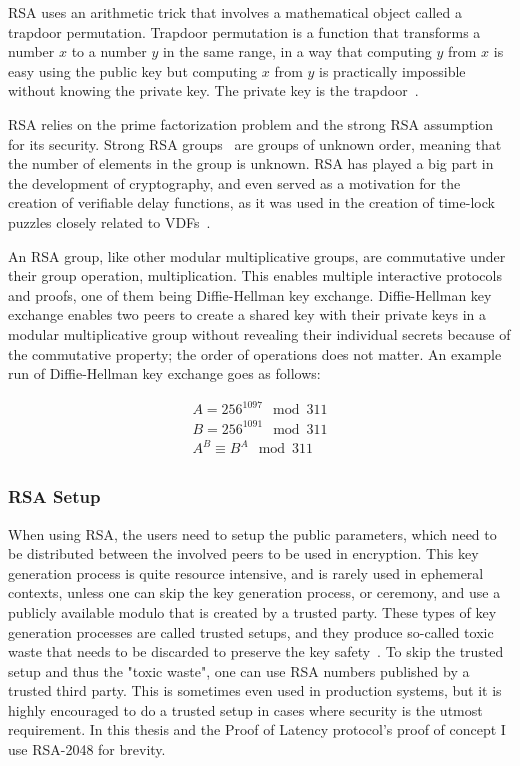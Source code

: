 RSA uses an arithmetic trick that involves a mathematical object called a trapdoor permutation. Trapdoor permutation is a function that transforms a number \(x\) to a number \(y\) in the same range, in a way that computing \(y\) from \(x\) is easy using the public key but computing \(x\) from \(y\) is practically impossible without knowing the private key. The private key is the trapdoor~\cite{Aumasson2018-nh}.

RSA relies on the prime factorization problem and the strong RSA assumption for its security. Strong RSA groups~\cite{Rivest2005-kc} are groups of unknown order, meaning that the number of elements in the group is unknown. RSA has played a big part in the development of cryptography, and even served as a motivation for the creation of verifiable delay functions, as it was used in the creation of time-lock puzzles closely related to VDFs~\cite{Boneh2018-sm, Mahmoody2013-zi}.

An RSA group, like other modular multiplicative groups, are commutative under their group operation, multiplication. This enables multiple interactive protocols and proofs, one of them being Diffie-Hellman key exchange. Diffie-Hellman key exchange enables two peers to create a shared key with their private keys in a modular multiplicative group without revealing their individual secrets because of the commutative property; the order of operations does not matter. An example run of Diffie-Hellman key exchange goes as follows:

\begin{align*}
	A = 256^{1097} \mod 311\\
  B = 256^{1091} \mod 311\\
	A^B \equiv B^A \mod 311\\
\end{align*}

\subsubsection{RSA Setup}
When using RSA, the users need to setup the public parameters, which need to be distributed between the involved peers to be used in encryption. This key generation process is quite resource intensive, and is rarely used in ephemeral contexts, unless one can skip the key generation process, or ceremony, and use a publicly available modulo that is created by a trusted party. These types of key generation processes are called trusted setups, and they produce so-called toxic waste that needs to be discarded to preserve the key safety~\cite{Bottinelli2020-dh}. To skip the trusted setup and thus the "toxic waste", one can use RSA numbers published by a trusted third party. This is sometimes even used in production systems, but it is highly encouraged to do a trusted setup in cases where security is the utmost requirement. In this thesis and the Proof of Latency protocol's proof of concept I use RSA-2048 for brevity.

